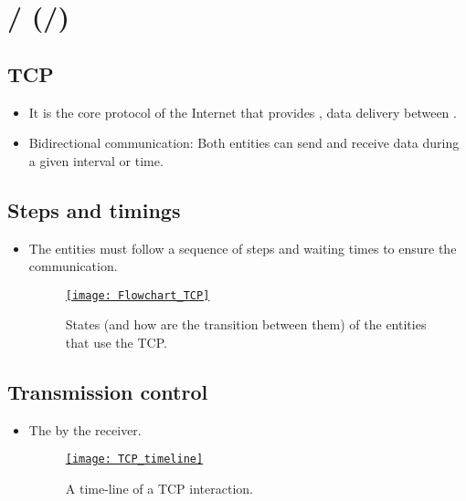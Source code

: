 \chapter{/ (/)}

\section{\gls{TCP}}
\begin{itemize}
\item It is the core protocol of the Internet that provides
  , data delivery between
  \cite{wikipedia_TCP}.
\item Bidirectional communication: Both entities can send and receive
  data during a given interval or time.
\end{itemize}

\section{Steps and timings}
\begin{itemize} 
\item The entities must follow a sequence of steps and waiting times to ensure the communication.
\begin{figure}[H]
  \vspace{-0ex}
  \centering
  \href{https://www.ibm.com/support/pages/flowchart-tcp-connections-and-their-definition}{\texttt{[image: Flowchart\_TCP]}}
  \caption{States (and how are the transition between them) of the
    entities that use the \gls{TCP}.}
  \label{fig:TCP_states}
\end{figure}
\end{itemize}


\section{Transmission control}
\begin{itemize} 
\item The  by the receiver.
\begin{figure}[H]
  \vspace{-0ex}
  \centering
  \href{https://ieeexplore.ieee.org/document/8668433}{\texttt{[image: TCP\_timeline]}}
  \caption{A time-line of a \gls{TCP} interaction.}
  \label{fig:TCP_interaction}
\end{figure}
\end{itemize}

